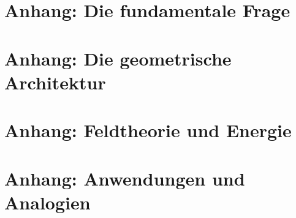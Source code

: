 \documentclass[11pt,openright,twoside]{book}
\begin{document}






\appendix

\part{Anhang: Die fundamentale Frage}


\part{Anhang: Die geometrische Architektur}





\part{Anhang: Feldtheorie und Energie}



\part{Anhang: Anwendungen und Analogien}



\end{document}
